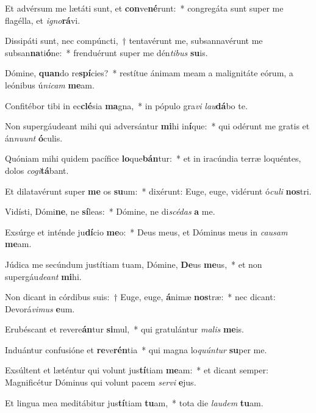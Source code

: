 \item Et advérsum me lætáti sunt, et \textbf{con}ve\textbf{né}runt:~* congregáta sunt super me flagélla, et \textit{i}\textit{gno}\textbf{rá}vi.
\item Dissipáti sunt, nec compúncti,~† tentavérunt me, subsannavérunt me subsan\textbf{na}ti\textbf{ó}ne:~* frenduérunt super me dén\textit{ti}\textit{bus} \textbf{su}is.
\item Dómine, \textbf{quan}do re\textbf{spí}cies?~* restítue ánimam meam a malignitáte eórum, a leónibus ú\textit{ni}\textit{cam} \textbf{me}am.
\item Confitébor tibi in ec\textbf{clé}sia \textbf{ma}gna,~* in pópulo gra\textit{vi} \textit{lau}\textbf{dá}bo te.
\item Non supergáudeant mihi qui adversántur \textbf{mi}hi in\textbf{í}que:~* qui odérunt me gratis et án\textit{nu}\textit{unt} \textbf{ó}culis.
\item Quóniam mihi quidem pacífice \textbf{lo}que\textbf{bán}tur:~* et in iracúndia terræ loquéntes, dolos \textit{co}\textit{gi}\textbf{tá}bant.
\item Et dilatavérunt super \textbf{me} os \textbf{su}um:~* dixérunt: Euge, euge, vidérunt ó\textit{cu}\textit{li} \textbf{nos}tri.
\item Vidísti, Dómi\textbf{ne}, ne \textbf{sí}leas:~* Dómine, ne di\textit{scé}\textit{das} \textbf{a} me.
\item Exsúrge et inténde ju\textbf{dí}cio \textbf{me}o:~* Deus meus, et Dóminus meus in \textit{cau}\textit{sam} \textbf{me}am.
\item Júdica me secúndum justítiam tuam, Dómine, \textbf{De}us \textbf{me}us,~* et non supergáu\textit{de}\textit{ant} \textbf{mi}hi.
\item Non dicant in córdibus suis:~† Euge, euge, \textbf{á}nimæ \textbf{nos}træ:~* nec dicant: Devorá\textit{vi}\textit{mus} \textbf{e}um.
\item Erubéscant et revere\textbf{án}tur \textbf{si}mul,~* qui gratulántur \textit{ma}\textit{lis} \textbf{me}is.
\item Induántur confusióne et \textbf{re}ve\textbf{rén}tia~* qui magna lo\textit{quún}\textit{tur} \textbf{su}per me.
\item Exsúltent et læténtur qui volunt jus\textbf{tí}tiam \textbf{me}am:~* et dicant semper: Magnificétur Dóminus qui volunt pacem \textit{ser}\textit{vi} \textbf{e}jus.
\item Et lingua mea meditábitur jus\textbf{tí}tiam \textbf{tu}am,~* tota die \textit{lau}\textit{dem} \textbf{tu}am.
